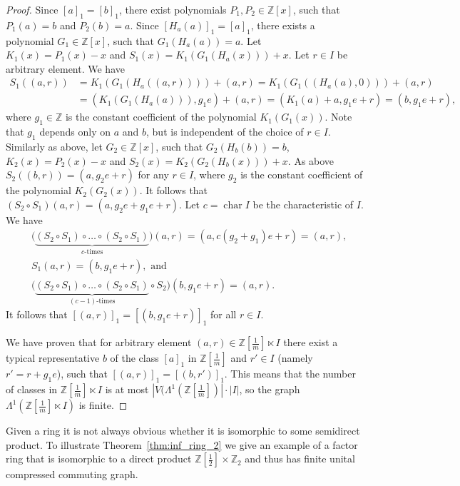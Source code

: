 \documentclass[12pt,a4paper]{amsart}
\theoremstyle{definition}
\newcommand{\Z}{\mathbb{Z}}
\DeclareMathOperator{\ch}{char}
\begin{document}
\begin{proof}
Since $[a]_1 = [b]_1$, there exist polynomials $P_1, P_2 \in \Z[x]$, such that $P_1(a) = b$ and $P_2(b) = a$. Since $[H_a(a)]_1 = [a]_1$, there exists a polynomial $G_1 \in \Z[x]$, such that $G_1(H_a(a)) = a$. Let $K_1(x) = P_1(x) - x$ and $S_1(x) = K_1(G_1(H_a(x))) + x$. Let $r \in I$ be arbitrary element. We have
\begin{align*}
    S_1((a, r)) &= K_1(G_1(H_a((a, r)))) + (a, r) = K_1(G_1((H_a(a), 0))) + (a, r) \\
    &= (K_1(G_1(H_a(a))), g_1e) + (a, r) = (K_1(a) + a, g_1e + r) = (b, g_1e + r),
\end{align*}
where $g_1 \in \Z$ is the constant coefficient of the polynomial $K_1(G_1(x))$. Note that $g_1$ depends only on $a$ and $b$, but is independent of the choice of $r \in I$. 
Similarly as above, let $G_2 \in \Z[x]$, such that $G_2(H_b(b)) = b$, $K_2(x) = P_2(x) - x$ and $S_2(x) = K_2(G_2(H_b(x))) + x$. As above $S_2((b, r)) = (a, g_2e + r)$ for any $r \in I$, where $g_2$ is the constant coefficient of the polynomial $K_2(G_2(x))$.
It follows that
$(S_2 \circ S_1)(a, r) = (a,g_2e + g_1e + r)$.
Let $c = \ch I$ be the characteristic of $I$. We have
\begin{align*}
&\big(\underbrace{(S_2 \circ S_1) \circ\ldots\circ(S_2 \circ S_1)}_{c\text{-times}}\big)(a, r) = (a, c(g_2+g_1)e + r)  = (a, r), \\
&S_1(a, r) = (b, g_1e + r), \text{ and }\\
&\big(\underbrace{(S_2 \circ S_1) \circ\ldots\circ(S_2 \circ S_1)}_{(c-1)\text{-times}} \circ S_2\big)(b, g_1e + r) = (a, r). 
\end{align*}
It follows that $[(a, r)]_1 = [(b, g_1e + r)]_1$ for all $r \in I$.

We have proven that for arbitrary element $(a, r) \in \Z[\frac1m] \ltimes I$ there exist a typical represen\-tative $b$ of the class $[a]_1$ in $\Z[\frac1m]$ and $r' \in I$ (namely $r' = r + g_1e$), such that $[(a, r)]_1 = [(b, r')]_1$.
This means that the number of classes in $\Z[\frac1m] \ltimes I$ is at most $|V(\Lambda^1(\Z[\frac1m])| \cdot |I|$, so the graph $\Lambda^1(\Z[\frac1m] \ltimes I)$ is finite.
\end{proof}

Given a ring it is not always obvious whether it is isomorphic to some semidirect product. To illustrate Theorem~\ref{thm:inf_ring_2} we give an example of a factor ring that is isomorphic to a direct product $\Z[\frac12] \times \Z_2$ and thus has finite unital compressed commuting graph.
\end{document}
